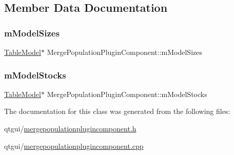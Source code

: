 \subsection{Member Data Documentation}
\mbox{\label{class_merge_population_plugin_component_acc4ffd3d2b76880a1554891f7e066a3d}} 
\subsubsection{\texorpdfstring{mModelSizes}{mModelSizes}}
{\footnotesize\ttfamily \mbox{\hyperlink{class_merge_population_plugin_component_1_1_table_model}{Table\+Model}}$\ast$ Merge\+Population\+Plugin\+Component\+::m\+Model\+Sizes\hspace{0.3cm}{\ttfamily [protected]}}

\mbox{\label{class_merge_population_plugin_component_a9c69d0d5e255c325e26544becb1ec170}} 
\subsubsection{\texorpdfstring{mModelStocks}{mModelStocks}}
{\footnotesize\ttfamily \mbox{\hyperlink{class_merge_population_plugin_component_1_1_table_model}{Table\+Model}}$\ast$ Merge\+Population\+Plugin\+Component\+::m\+Model\+Stocks\hspace{0.3cm}{\ttfamily [protected]}}



The documentation for this class was generated from the following files\+:\begin{DoxyCompactItemize}
\item 
qtgui/\mbox{\hyperlink{mergepopulationplugincomponent_8h}{mergepopulationplugincomponent.\+h}}\item 
qtgui/\mbox{\hyperlink{mergepopulationplugincomponent_8cpp}{mergepopulationplugincomponent.\+cpp}}\end{DoxyCompactItemize}
